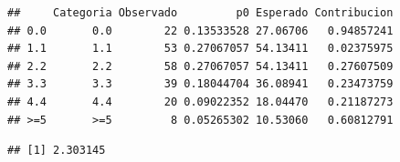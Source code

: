 \documentclass[
]{article}
\newenvironment{Shaded}{\begin{snugshade}}{\end{snugshade}}
\newcommand{\AttributeTok}[1]{\textcolor[rgb]{0.13,0.29,0.53}{#1}}
\newcommand{\CommentTok}[1]{\textcolor[rgb]{0.56,0.35,0.01}{\textit{#1}}}
\newcommand{\DecValTok}[1]{\textcolor[rgb]{0.00,0.00,0.81}{#1}}
\newcommand{\FunctionTok}[1]{\textcolor[rgb]{0.13,0.29,0.53}{\textbf{#1}}}
\newcommand{\NormalTok}[1]{#1}
\newcommand{\OtherTok}[1]{\textcolor[rgb]{0.56,0.35,0.01}{#1}}
\newcommand{\SpecialCharTok}[1]{\textcolor[rgb]{0.81,0.36,0.00}{\textbf{#1}}}
\begin{document}
\begin{Shaded}
\end{Shaded}

\begin{verbatim}
##     Categoria Observado         p0 Esperado Contribucion
## 0.0       0.0        22 0.13533528 27.06706   0.94857241
## 1.1       1.1        53 0.27067057 54.13411   0.02375975
## 2.2       2.2        58 0.27067057 54.13411   0.27607509
## 3.3       3.3        39 0.18044704 36.08941   0.23473759
## 4.4       4.4        20 0.09022352 18.04470   0.21187273
## >=5       >=5         8 0.05265302 10.53060   0.60812791
\end{verbatim}

\begin{Shaded}
\end{Shaded}

\begin{verbatim}
## [1] 2.303145
\end{verbatim}
\end{document}
